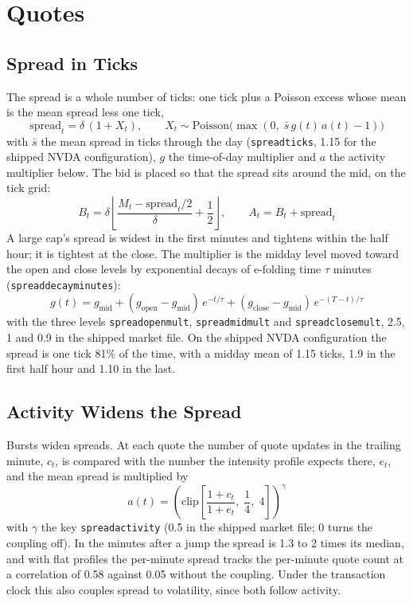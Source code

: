 \documentclass[11pt,a4paper]{article}
\newcommand{\key}[1]{\texttt{#1}}
\theoremstyle{paper}
\begin{document}
\section{Quotes}

\subsection{Spread in Ticks}

The spread is a whole number of ticks: one tick plus a Poisson excess whose mean is the mean spread less one tick,
\begin{equation}
\text{spread}_t=\delta\,(1+X_t),\qquad X_t\sim\text{Poisson}\bigl(\max(0,\;\bar s\,g(t)\,a(t)-1)\bigr)
\end{equation}
with $\bar s$ the mean spread in ticks through the day (\key{spreadticks}, 1.15 for the shipped NVDA configuration), $g$ the time-of-day multiplier and $a$ the activity multiplier below. The bid is placed so that the spread sits around the mid, on the tick grid:
\begin{equation}
B_t=\delta\left\lfloor\frac{M_t-\text{spread}_t/2}{\delta}+\frac12\right\rfloor,\qquad A_t=B_t+\text{spread}_t
\end{equation}
A large cap's spread is widest in the first minutes and tightens within the half hour; it is tightest at the close. The multiplier is the midday level moved toward the open and close levels by exponential decays of e-folding time $\tau$ minutes (\key{spreaddecayminutes}):
\begin{equation}
g(t)=g_{\text{mid}}+(g_{\text{open}}-g_{\text{mid}})\,e^{-t/\tau}+(g_{\text{close}}-g_{\text{mid}})\,e^{-(T-t)/\tau}
\end{equation}
with the three levels \key{spreadopenmult}, \key{spreadmidmult} and \key{spreadclosemult}, 2.5, 1 and 0.9 in the shipped market file. On the shipped NVDA configuration the spread is one tick 81\% of the time, with a midday mean of 1.15 ticks, 1.9 in the first half hour and 1.10 in the last.

\subsection{Activity Widens the Spread}

Bursts widen spreads. At each quote the number of quote updates in the trailing minute, $c_t$, is compared with the number the intensity profile expects there, $e_t$, and the mean spread is multiplied by
\begin{equation}
a(t)=\left(\text{clip}\left[\frac{1+c_t}{1+e_t},\;\frac14,\;4\right]\right)^{\gamma}
\end{equation}
with $\gamma$ the key \key{spreadactivity} (0.5 in the shipped market file; 0 turns the coupling off). In the minutes after a jump the spread is 1.3 to 2 times its median, and with flat profiles the per-minute spread tracks the per-minute quote count at a correlation of 0.58 against 0.05 without the coupling. Under the transaction clock this also couples spread to volatility, since both follow activity.
\end{document}

